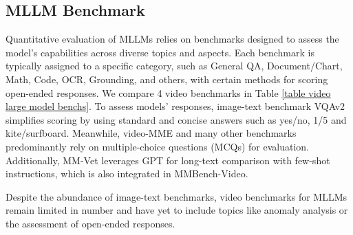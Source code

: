  \subsection{MLLM Benchmark}
Quantitative evaluation of MLLMs relies on benchmarks designed to assess the model’s capabilities across diverse topics and aspects. Each benchmark is typically assigned to a specific category, such as General QA, Document/Chart, Math, Code, OCR, Grounding, and others, with certain methods for scoring open-ended responses.  We compare 4 video benchmarks in Table \ref{table video large model benchs}. To assess models' responses, image-text benchmark VQAv2\cite{VQAv2} simplifies scoring by using standard and concise answers such as yes/no, 1/5 and kite/surfboard. 
  Meanwhile, video-MME\cite{video-mme} and many other benchmarks predominantly rely on multiple-choice questions (MCQs) for evaluation. 
 Additionally, MM-Vet\cite{mm-vet} leverages GPT for long-text comparison with few-shot instructions, which is also integrated in MMBench-Video\cite{mmbench-video}.

 Despite the abundance of image-text benchmarks, video benchmarks for MLLMs remain limited in number and have yet to include topics like anomaly analysis or the assessment of open-ended responses.